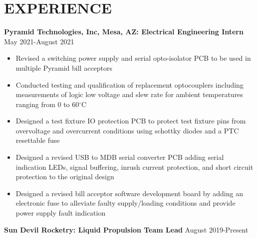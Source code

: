 \documentclass{article}
\begin{document}
\section{EXPERIENCE}
\textbf{Pyramid Technologies, Inc, Mesa, AZ: Electrical Engineering Intern}
\hfill 
\vspace{0.5em}
May 2021-August 2021
\begin{itemize}
\item{Revised a switching power supply and serial opto-isolator PCB to be used in multiple Pyramid bill acceptors}
\item{Conducted testing and qualification of replacement optocouplers including measurements of logic low voltage and slew rate for ambient temperatures ranging from 0 to 60$^{\circ}$C}
\item{Designed a test fixture IO protection PCB to protect test fixture pins from overvoltage and overcurrent conditions using schottky diodes and a PTC resettable fuse}
\item{Designed a revised USB to MDB serial converter PCB adding serial indication LEDs, signal buffering, inrush current protection, and short circuit protection to the original design}
\item{Designed a revised bill acceptor software development board by adding an electronic fuse to alleviate faulty supply/loading conditions and provide power supply fault indication}
\end{itemize}
\vspace{0.5em}
\textbf{Sun Devil Rocketry: Liquid Propulsion Team Lead}
\hfill
\vspace{0.5em}
August 2019-Present
\end{document}
